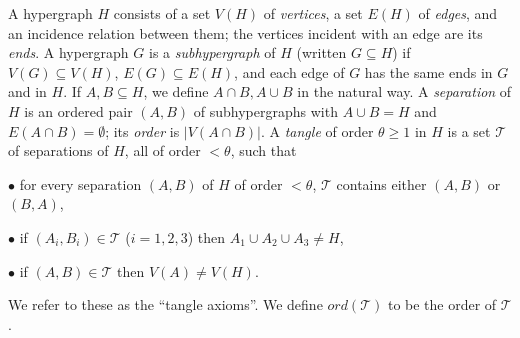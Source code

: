 
A hypergraph $H$ consists of a set $V(H)$ of \textit{vertices}, a set $E(H)$ of \textit{edges}, and an incidence relation between them; the vertices incident with an edge are its \textit{ends}. A hypergraph $G$ is a \textit{subhypergraph} of $H$ (written $G\subseteq H$) if $V(G)\subseteq V(H)$, $E(G)\subseteq E(H)$, and each edge of $G$ has the same ends in $G$ and in $H$. If $A, B\subseteq H$, we define $A\cap B, A\cup B$ in the natural way. A \textit{separation} of $H$ is an ordered pair $(A, B)$ of subhypergraphs with $A\cup B = H$ and $E(A\cap B) = \emptyset$; its \textit{order} is $|V(A\cap B)|$. A \textit{tangle} of order $\theta\ge 1$ in $H$ is a set $\mathscr{T}$ of separations of $H$, all of order $<\theta$, such that

\hspace*{12pt}$\bullet$ for every separation $(A, B)$ of $H$ of order $<\theta$, $\mathscr{T}$ contains either $(A, B)$ or $(B, A)$,

\hspace*{12pt}$\bullet$ if $(A_i, B_i)\in \mathscr{T}$ ($i = 1, 2, 3$) then $A_1\cup A_2\cup A_3\ne H$,

\hspace*{12pt}$\bullet$ if $(A, B)\in \mathscr{T}$ then $V(A)\ne V(H)$.

We refer to these as the ``tangle axioms''. We define $ord(\mathscr{T})$ to be the order of $\mathscr{T}$.
